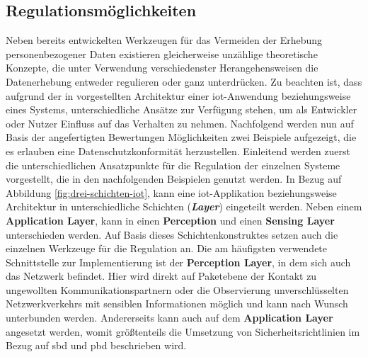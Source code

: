 \subsection{Regulationsmöglichkeiten}
\label{sec:Hauptteil:ssec:Regulationsmöglichkeiten}
Neben bereits entwickelten Werkzeugen für das Vermeiden der Erhebung personenbezogener Daten existieren gleicherweise unzählige theoretische Konzepte, die unter Verwendung verschiedenster Herangehensweisen die Datenerhebung entweder regulieren oder ganz unterdrücken. Zu beachten ist, dass aufgrund der in  vorgestellten Architektur einer \ac{iot}-Anwendung beziehungsweise eines Systems, unterschiedliche Ansätze zur Verfügung stehen, um als Entwickler oder Nutzer Einfluss auf das Verhalten zu nehmen. Nachfolgend werden nun auf Basis der angefertigten Bewertungen Möglichkeiten zwei Beispiele aufgezeigt, die es erlauben eine Datenschutzkonformität herzustellen.
Einleitend werden zuerst die unterschiedlichen Ansatzpunkte für die Regulation der einzelnen Systeme vorgestellt, die in den nachfolgenden Beispielen genutzt werden.
In Bezug auf Abbildung \ref{fig:drei-schichten-iot}, kann eine \ac{iot}-Applikation beziehungsweise Architektur in unterschiedliche Schichten (\textbf{\textit{Layer}}) eingeteilt werden. Neben einem \textbf{Application Layer}, kann in einen \textbf{Perception} und einen \textbf{Sensing Layer} unterschieden werden. Auf Basis dieses Schichtenkonstruktes setzen auch die einzelnen Werkzeuge für die Regulation an. Die am häufigsten verwendete Schnittstelle zur Implementierung ist der \textbf{Perception Layer}, in dem sich auch das Netzwerk befindet. Hier wird direkt auf Paketebene der Kontakt zu ungewollten Kommunikationspartnern oder die Observierung unverschlüsselten Netzwerkverkehrs mit sensiblen Informationen möglich und kann nach Wunsch unterbunden werden. Andererseits kann auch auf dem \textbf{Application Layer} angesetzt werden, womit größtenteils die Umsetzung von Sicherheitsrichtlinien im Bezug auf \ac{sbd} und \ac{pbd} beschrieben wird.


